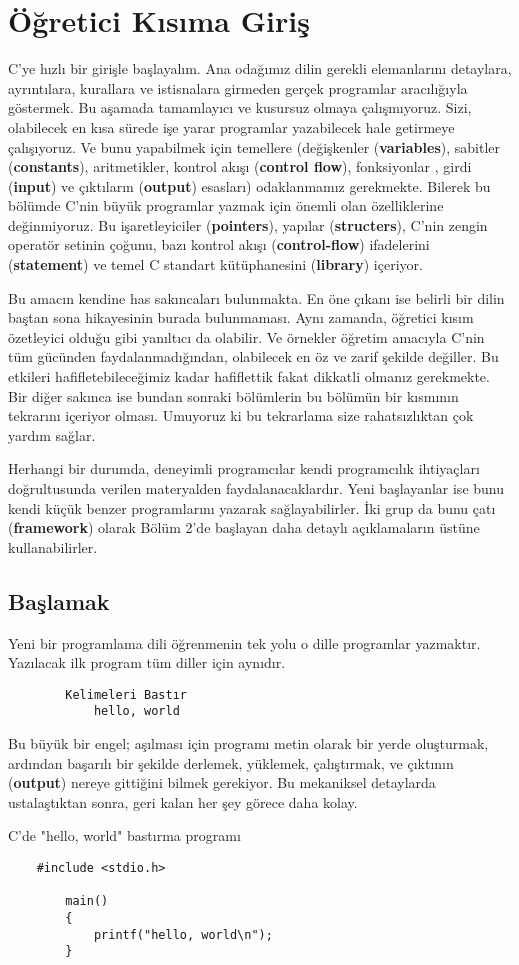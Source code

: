 \documentclass[a4paper,12pt,oneside]{book}
\begin{document}
\chapter{Öğretici Kısıma Giriş}
C'ye hızlı bir girişle başlayalım. Ana odağımız dilin gerekli elemanlarını detaylara, ayrıntılara, kurallara ve istisnalara girmeden gerçek programlar aracılığıyla göstermek. Bu aşamada tamamlayıcı ve kusursuz olmaya çalışmıyoruz. Sizi, olabilecek en kısa sürede işe yarar programlar yazabilecek hale getirmeye çalışıyoruz. Ve bunu yapabilmek için temellere (değişkenler (\textbf{variables}), sabitler (\textbf{constants}), aritmetikler, kontrol akışı (\textbf{control flow}), fonksiyonlar , girdi (\textbf{input}) ve çıktıların (\textbf{output}) esasları) odaklanmamız gerekmekte. Bilerek bu bölümde C'nin büyük programlar yazmak için önemli olan özelliklerine değinmiyoruz. Bu işaretleyiciler (\textbf{pointers}), yapılar (\textbf{structers}), C'nin zengin operatör setinin çoğunu, bazı kontrol akışı (\textbf{control-flow}) ifadelerini (\textbf{statement}) ve temel C standart kütüphanesini (\textbf{library}) içeriyor.
\par Bu amacın kendine has sakıncaları bulunmakta. En öne çıkanı ise belirli bir dilin baştan sona hikayesinin burada bulunmaması. Aynı zamanda, öğretici kısım özetleyici olduğu gibi yanıltıcı da olabilir. Ve örnekler öğretim amacıyla C'nin tüm gücünden faydalanmadığından, olabilecek en öz ve zarif şekilde değiller. Bu etkileri hafifletebileceğimiz kadar hafiflettik fakat dikkatli olmanız gerekmekte. Bir diğer sakınca ise bundan sonraki bölümlerin bu bölümün bir kısmının tekrarını içeriyor olması. Umuyoruz ki bu tekrarlama size rahatsızlıktan çok yardım sağlar.
\par Herhangi bir durumda, deneyimli programcılar kendi programcılık ihtiyaçları doğrultusunda verilen materyalden faydalanacaklardır. Yeni başlayanlar ise bunu kendi küçük benzer programlarını yazarak sağlayabilirler. İki grup da bunu çatı (\textbf{framework}) olarak Bölüm 2'de başlayan daha detaylı açıklamaların üstüne kullanabilirler. \pagebreak

\section{Başlamak}

Yeni bir programlama dili öğrenmenin tek yolu o dille programlar yazmaktır. Yazılacak ilk program tüm diller için aynıdır.
\begin{lstlisting}
		Kelimeleri Bastır
			hello, world
\end{lstlisting}
\par Bu büyük bir engel; aşılması için programı metin olarak bir yerde oluşturmak, ardından başarılı bir şekilde derlemek, yüklemek, çalıştırmak, ve çıktının (\textbf{output}) nereye gittiğini bilmek gerekiyor. Bu mekaniksel detaylarda ustalaştıktan sonra, geri kalan her şey görece daha kolay.
    \par C'de "hello, world" bastırma programı
\begin{lstlisting}
    #include <stdio.h>

        main()
        {
            printf("hello, world\n");
        }
\end{lstlisting}
\end{document}
